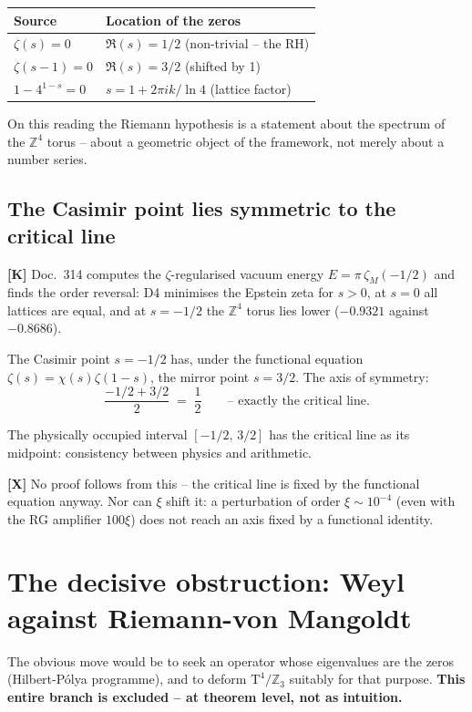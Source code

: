 \begin{center}
\begin{tabular}{ll}
\toprule
Source & Location of the zeros \\
\midrule
$\zeta(s) = 0$ & $\Re(s) = 1/2$ (non-trivial -- the RH) \\
$\zeta(s-1) = 0$ & $\Re(s) = 3/2$ (shifted by 1) \\
$1 - 4^{1-s} = 0$ & $s = 1 + 2\pi i k/\ln 4$ (lattice factor) \\
\bottomrule
\end{tabular}
\end{center}

On this reading the Riemann hypothesis is a statement about the spectrum
of the $\mathbb{Z}^4$ torus -- about a geometric object of the
framework, not merely about a number series.

\subsection{The Casimir point lies symmetric to the critical line}
\label{sec:casimir}

\textbf{[K]} Doc.~314 computes the $\zeta$-regularised vacuum energy
$E = \pi\,\zeta_M(-1/2)$ and finds the order reversal: D4 minimises the
Epstein zeta for $s > 0$, at $s = 0$ all lattices are equal, and at
$s = -1/2$ the $\mathbb{Z}^4$ torus lies lower ($-0.9321$ against
$-0.8686$).

The Casimir point $s = -1/2$ has, under the functional equation
$\zeta(s) = \chi(s)\zeta(1-s)$, the mirror point $s = 3/2$. The axis of
symmetry:
\[
  \frac{-1/2 + 3/2}{2} \;=\; \frac12
  \qquad\text{-- exactly the critical line.}
\]

The physically occupied interval $[-1/2,\,3/2]$ has the critical line as
its midpoint: consistency between physics and arithmetic.

\textbf{[X]} No proof follows from this -- the critical line is fixed by
the functional equation anyway. Nor can $\xi$ shift it: a perturbation
of order $\xi \sim 10^{-4}$ (even with the RG amplifier $100\xi$) does
not reach an axis fixed by a functional identity.

\section{The decisive obstruction: Weyl against Riemann-von Mangoldt}
\label{sec:weyl}

The obvious move would be to seek an operator whose eigenvalues are the
zeros (Hilbert-P\'olya programme), and to deform
$\text{T}^4/\mathbb{Z}_3$ suitably for that purpose. \textbf{This entire
branch is excluded -- at theorem level, not as intuition.}

